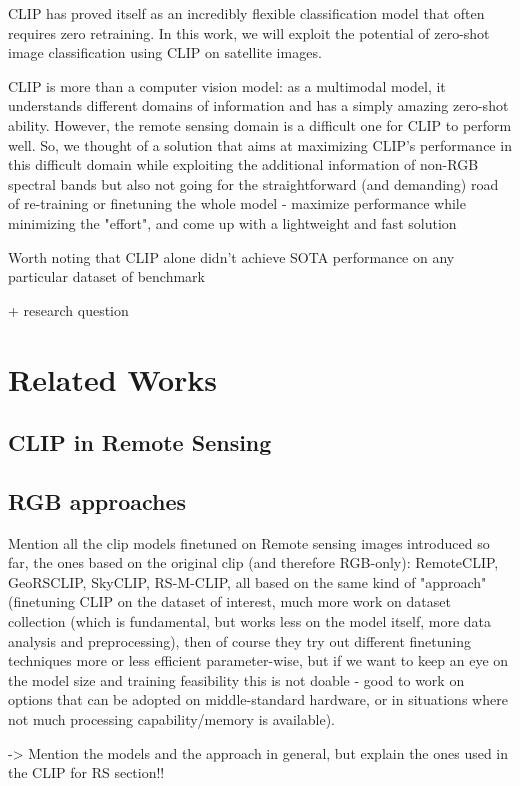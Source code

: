 \documentclass[a4paper, oneside, english]{sapthesis}
\begin{document}
CLIP has proved itself as an incredibly flexible classification model that often requires zero retraining. In this work, we will exploit the potential of zero-shot image classification using CLIP on satellite images.

CLIP is more than a computer vision model: as a multimodal model, it understands different domains of information and has a simply amazing zero-shot ability. However, the remote sensing domain is a difficult one for CLIP to perform well. So, we thought of a solution that aims at maximizing CLIP's performance in this difficult domain while exploiting the additional information of non-RGB spectral bands but also not going for the straightforward (and demanding) road of re-training or finetuning the whole model - maximize performance while minimizing the "effort", and come up with a lightweight and fast solution

Worth noting that CLIP alone didn't achieve SOTA performance on any particular dataset of benchmark

+ research question



\chapter{Related Works} %
\section{CLIP in Remote Sensing}
\section{RGB approaches}

Mention all the clip models finetuned on Remote sensing images introduced so far, the ones based on the original clip (and therefore RGB-only): RemoteCLIP, GeoRSCLIP, SkyCLIP, RS-M-CLIP, all based on the same kind of "approach" (finetuning CLIP on the dataset of interest, much more work on dataset collection (which is fundamental, but works less on the model itself, more data analysis and preprocessing), then of course they try out different finetuning techniques more or less efficient parameter-wise, but if we want to keep an eye on the model size and training feasibility this is not doable - good to work on options that can be adopted on middle-standard hardware, or in situations where not much processing capability/memory is available).

-> Mention the models and the approach in general, but explain the ones used in the CLIP for RS section!!
\end{document}
